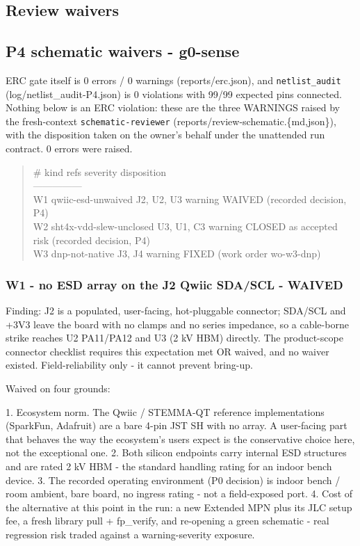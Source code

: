 \documentclass[11pt,a4paper]{article}
\begin{document}
\subsection*{Review waivers}
\subsection*{P4 schematic waivers - g0-sense}
ERC gate itself is 0 errors / 0 warnings (reports/erc.json), and \texttt{netlist\_audit} (log/netlist\_audit-P4.json) is 0 violations with 99/99 expected pins connected. Nothing below is an ERC violation: these are the three WARNINGS raised by the fresh-context \texttt{schematic-reviewer} (reports/review-schematic.\{md,json\}), with the disposition taken on the owner's behalf under the unattended run contract. 0 errors were raised.

\begin{quote}\small\ttfamily\raggedright
\textbar{} \# \textbar{} kind \textbar{} refs \textbar{} severity \textbar{} disposition \textbar{}\\
\textbar{}---\textbar{}---\textbar{}---\textbar{}---\textbar{}---\textbar{}\\
\textbar{} W1 \textbar{} qwiic-esd-unwaived \textbar{} J2, U2, U3 \textbar{} warning \textbar{} WAIVED (recorded decision, P4) \textbar{}\\
\textbar{} W2 \textbar{} sht4x-vdd-slew-unclosed \textbar{} U3, U1, C3 \textbar{} warning \textbar{} CLOSED as accepted risk (recorded decision, P4) \textbar{}\\
\textbar{} W3 \textbar{} dnp-not-native \textbar{} J3, J4 \textbar{} warning \textbar{} FIXED (work order wo-w3-dnp) \textbar{}
\end{quote}
\subsubsection*{W1 - no ESD array on the J2 Qwiic SDA/SCL - WAIVED}
Finding: J2 is a populated, user-facing, hot-pluggable connector; SDA/SCL and +3V3 leave the board with no clamps and no series impedance, so a cable-borne strike reaches U2 PA11/PA12 and U3 (2 kV HBM) directly. The product-scope connector checklist requires this expectation met OR waived, and no waiver existed. Field-reliability only - it cannot prevent bring-up.

Waived on four grounds:

1. Ecosystem norm. The Qwiic / STEMMA-QT reference implementations (SparkFun, Adafruit) are a bare 4-pin JST SH with no array. A user-facing part that behaves the way the ecosystem's users expect is the conservative choice here, not the exceptional one. 2. Both silicon endpoints carry internal ESD structures and are rated 2 kV HBM - the standard handling rating for an indoor bench device. 3. The recorded operating environment (P0 decision) is indoor bench / room ambient, bare board, no ingress rating - not a field-exposed port. 4. Cost of the alternative at this point in the run: a new Extended MPN plus its JLC setup fee, a fresh library pull + fp\_verify, and re-opening a green schematic - real regression risk traded against a warning-severity exposure.
\end{document}
